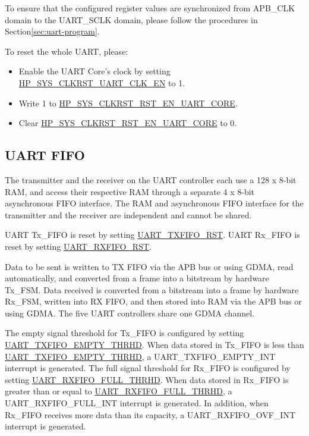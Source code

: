 \documentclass[main\_\_EN.tex]{subfiles}
\begin{document}
To ensure that the configured register values are synchronized from APB\_CLK domain to the UART\_SCLK domain, please follow the procedures in Section\ref{sec:uart-program}.


To reset the whole UART, please:
\begin{itemize}
    \item Enable the UART Core's clock by setting \hyperref[fielddesc:HPSYSCLKRSTUART0CLKEN]{HP\_SYS\_CLKRST\_UART\_CLK\_EN} to 1.
    \item Write 1 to \hyperref[fielddesc:HPSYSCLKRSTRSTENUART0CORE]{HP\_SYS\_CLKRST\_RST\_EN\_UART\_CORE}.
    \item Clear \hyperref[fielddesc:HPSYSCLKRSTRSTENUART0CORE]{HP\_SYS\_CLKRST\_RST\_EN\_UART\_CORE} to 0.

\end{itemize}


\subsection{UART FIFO}

The transmitter and the receiver on the UART controller each use a 128 x 8-bit RAM, and access their respective RAM through a separate 4 x 8-bit asynchronous FIFO interface. The RAM and asynchronous FIFO interface for the transmitter and the receiver are independent and cannot be shared.

UART Tx\_FIFO is reset by setting \hyperref[fielddesc:UARTTXFIFORST]{UART\_TXFIFO\_RST}. UART Rx\_FIFO is reset by setting \hyperref[fielddesc:UARTRXFIFORST]{UART\_RXFIFO\_RST}.

Data to be sent is written to TX FIFO via the APB bus or using GDMA, read automatically, and converted from a frame into a bitstream by hardware Tx\_FSM. Data received is converted from a bitstream into a frame by hardware Rx\_FSM, written into RX FIFO, and then stored into RAM via the APB bus or using GDMA. The five UART controllers share one GDMA channel.

The empty signal threshold for Tx\_FIFO is configured by setting \hyperref[fielddesc:UARTTXFIFOEMPTYTHRHD]{UART\_TXFIFO\_EMPTY\_THRHD}. When data stored in Tx\_FIFO is less than \hyperref[fielddesc:UARTTXFIFOEMPTYTHRHD]{UART\_TXFIFO\_EMPTY\_THRHD}, a UART\_TXFIFO\_EMPTY\_INT interrupt is generated. The full signal threshold for Rx\_FIFO is configured by setting \hyperref[fielddesc:UARTRXFIFOFULLTHRHD]{UART\_RXFIFO\_FULL\_THRHD}. When data stored in Rx\_FIFO is greater than or equal to \hyperref[fielddesc:UARTRXFIFOFULLTHRHD]{UART\_RXFIFO\_FULL\_THRHD}, a UART\_RXFIFO\_FULL\_INT interrupt is generated. In addition, when Rx\_FIFO receives more data than its capacity, a UART\_RXFIFO\_OVF\_INT interrupt is generated.
\end{document}
